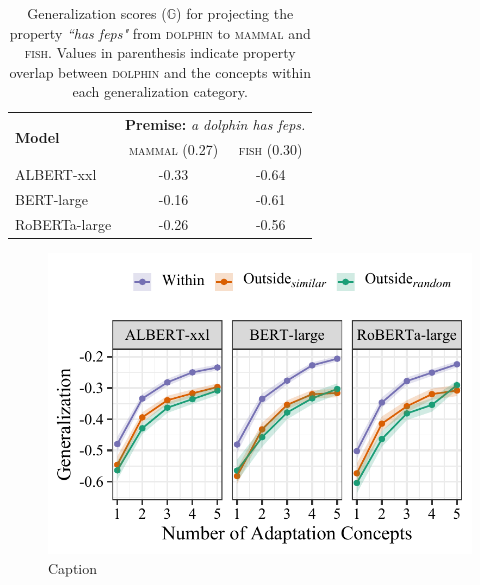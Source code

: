 \documentclass[10pt,letterpaper]{article}
\begin{document}
\begin{table}[h]
\centering
\caption{Generalization scores ($\mathbb{G}$) for projecting the property \textit{``has feps"} from \textsc{dolphin} to \textsc{mammal} and \textsc{fish}. Values in parenthesis indicate property overlap between \textsc{dolphin} and the concepts within each generalization category.}
\label{tab:dolphin}
\vspace{1em}
\def\arraystretch{1.25}

\begin{tabular}{|l|cc|}
\hline
\multirow{2}{*}{\textbf{Model}} & \multicolumn{2}{c|}{\textbf{Premise:} \textit{a dolphin has feps.}}                   \\ \cline{2-3} 
                                & \multicolumn{1}{c|}{\textsc{mammal} (0.27)} & \textsc{fish} (0.30) \\ \hline
ALBERT-xxl                      & \multicolumn{1}{c|}{-0.33}                  & -0.64                \\ 
BERT-large                      & \multicolumn{1}{c|}{-0.16}                  & -0.61                \\ 
RoBERTa-large                   & \multicolumn{1}{c|}{-0.26}                  & -0.56                \\ \hline
\end{tabular}%

\end{table}

\begin{figure}[h]
    \centering
    \includegraphics[width=\columnwidth]{generalization.pdf}
    \caption{Caption}
    \label{fig:gen}
\end{figure}
\end{document}
